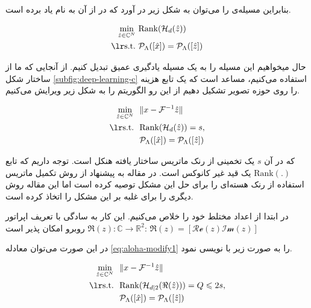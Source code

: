 بنابراین مسیله‌ی 
را می‌توان به شکل زیر در آورد که در \cite{Jin_2016} از آن به نام  یاد برده است.



\removevspace
\begin{subequations}
	\begin{align}
		\min_{\hat{z}\in\mathbb{C}^N} \ &\mathrm{Rank}(\mathcal{H}_d(\hat{z})) \\
		\lrtext{s.t.} \ & \Rho_\Lambda([\hat{x}]) = \Rho_\Lambda([\hat{z}])
	\end{align}
\end{subequations}


حال میخواهیم این مسيله را به یک مسیله یادگیری عمیق 
تبدیل کنیم. از آنجایی که ما از ساختار شکل \ref{subfig:deep-learning-c}
استفاده می‌کنیم، مساعد است که یک تابع هزینه را روی حوزه تصویر تشکیل دهیم از این رو الگوریتم  را به شکل زیر ویرایش می‌کنیم.


\begin{subequations}\label{eq:aloha-modify1}
	\begin{align}
		\min_{\hat{z}\in\mathbb{C}^N} \ \  & \| x - \F^{-1}{\hat{z}}\| \\
		\lrtext{s.t.} \ \  & \mathrm{Rank}(\mathcal{H}_d(\hat{z})) = s, \\
		& \Rho_\Lambda([\hat{x}]) = \Rho_\Lambda([\hat{z}])
	\end{align}
\end{subequations}

که در آن $s$ یک تخمینی از رنک ماتریس ساختار یافته هنکل است. توجه داریم که تابع
$\mathrm{Rank}(.)$
یک قید غیر کانوکس 
است. در مقاله \cite{Jin_2016}
به پیشنهاد از روش تکمیل ماتریس 
\cite{Cand_s_2009}
استفاده از رنک هسته‌ای
را برای حل این مشکل توصیه کرده است اما این مقاله روش دیگری را برای غلبه بر این مشکل را اتخاذ کرده است. 

در ابتدا از اعداد مختلط خود را خلاص می‌کنیم. این کار به سادگی با تعریف اپراتور $\Re(z): \mathbb{C}\rightarrow\mathbb{R}^2$
روبرو امکان پذیر است:
$\Re(z) = [\mathcal{Re}(z) \mathcal{Im}(z)]$

در این صورت می‌توان معادله \ref{eq:aloha-modify1}
را به صورت زیر با نویسی نمود.

\begin{subequations}
	\begin{align}
		\min_{\hat{z}\in\mathbb{C}^N} \ \  & \| x - \F^{-1}{\hat{z}}\| \\
		\lrtext{s.t.} \ \  & \mathrm{Rank}(\mathcal{H}_{d|2}(\Re(\hat{z}))) = Q \le 2s, \\ 
		& \Rho_\Lambda([\hat{x}]) = \Rho_\Lambda([\hat{z}])
	\end{align}
\end{subequations}

